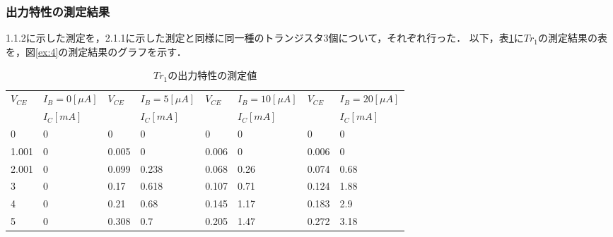 \documentclass[10pt, a4j, dvipdfmx]{jarticle}
\begin{document}
    \newpage
    \subsubsection{出力特性の測定結果}
    1.1.2に示した測定を，2.1.1に示した測定と同様に同一種のトランジスタ3個について，それぞれ行った．
    以下，表\ref{tbl:4}に$Tr_1$の測定結果の表を，図\ref{ex:4}の測定結果のグラフを示す．
    \begin{table}[H]
        \centering
        \caption{$Tr_1$の出力特性の測定値}
        \label{tbl:4}
        \small
        \begin{tabular}{|l|l|l|l|l|l|l|l|}
            \hline
            \multirow{2}{*}{$V_{CE}$} & $I_B=0[\mu A]$ & \multirow{2}{*}{$V_{CE}$} & $I_B=5[\mu A]$ & \multirow{2}{*}{$V_{CE}$} & $I_B=10[\mu A]$ & \multirow{2}{*}{$V_{CE}$} & $I_B=20[\mu A]$ \\ \cline{2-2} \cline{4-4} \cline{6-6} \cline{8-8} 
            & $I_C[mA]$      &                           & $I_C[mA]$      &                           & $I_C[mA]$       &                           & $I_C[mA]$       \\ \hline
            0                         & 0              & 0                         & 0              & 0                         & 0               & 0                         & 0               \\ \hline
            1.001                     & 0              & 0.005                     & 0              & 0.006                     & 0               & 0.006                     & 0               \\ \hline
            2.001                     & 0              & 0.099                     & 0.238          & 0.068                     & 0.26            & 0.074                     & 0.68            \\ \hline
            3                         & 0              & 0.17                      & 0.618          & 0.107                     & 0.71            & 0.124                     & 1.88            \\ \hline
            4                         & 0              & 0.21                      & 0.68           & 0.145                     & 1.17            & 0.183                     & 2.9             \\ \hline
            5                         & 0              & 0.308                     & 0.7            & 0.205                     & 1.47            & 0.272                     & 3.18            \\ \hline

\end{tabular}
\end{table}
\end{document}
